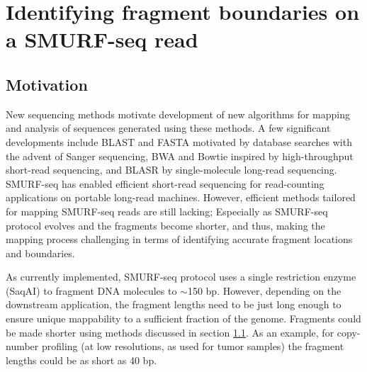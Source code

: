 \chapter{Identifying fragment boundaries on a SMURF-seq read}
\label{ch4}

\section{Motivation}
New sequencing methods motivate development of new algorithms for
mapping and analysis of sequences generated using these methods. A few
significant developments include BLAST \citep{altschul1990basic} and
FASTA \citep{pearson1988improved} motivated by database searches with the
advent of Sanger sequencing, BWA \citep{li2009fast} and Bowtie
\citep{langmead2009ultrafast} inspired by high-throughput short-read
sequencing, and BLASR \citep{chaisson2012mapping} by single-molecule
long-read sequencing.
SMURF-seq has enabled efficient short-read sequencing for read-counting
applications on portable long-read machines.  However, efficient methods
tailored for mapping SMURF-seq reads are still lacking; Especially as
SMURF-seq protocol evolves and the fragments become shorter, and thus,
making the mapping process challenging in terms of identifying accurate
fragment locations and boundaries.

As currently implemented, SMURF-seq protocol uses a single restriction
enzyme (SaqAI) to fragment DNA molecules to $\sim$150 bp. However,
depending on the downstream application, the fragment lengths need to be
just long enough to ensure unique mappability to a sufficient fraction
of the genome.
Fragments could be made shorter using methods discussed in section
\ref{}.  As an example, for copy-number profiling (at low
resolutions, as used for tumor samples) the fragment lengths could be as
short as 40 bp.

